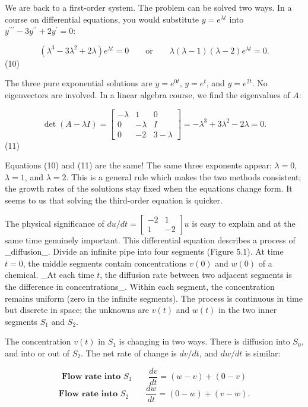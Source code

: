 We are back to a first-order system. The problem can be solved two ways. In a course on differential equations, you would substitute \(y=e^{\lambda t}\) into \(y^{\prime\prime\prime}-3y^{\prime\prime}+2y^{\prime}=0\):

\[(\lambda^{3}-3\lambda^{2}+2\lambda)e^{\lambda t}=0\qquad\text{or}\qquad\lambda( \lambda-1)(\lambda-2)e^{\lambda t}=0.\] (10)

The three pure exponential solutions are \(y=e^{0t}\), \(y=e^{t}\), and \(y=e^{2t}\). No eigenvectors are involved. In a linear algebra course, we find the eigenvalues of \(A\):

\[\det(A-\lambda I)=\begin{bmatrix}-\lambda&1&0\\ 0&-\lambda&I\\ 0&-2&3-\lambda\end{bmatrix}=-\lambda^{3}+3\lambda^{2}-2\lambda=0.\] (11)

Equations (10) and (11) are the same! The same three exponents appear: \(\lambda=0\), \(\lambda=1\), and \(\lambda=2\). This is a general rule which makes the two methods consistent; the growth rates of the solutions stay fixed when the equations change form. It seems to us that solving the third-order equation is quicker.

The physical significance of \(du/dt=\left[\begin{smallmatrix}-2&1\\ 1&-2\end{smallmatrix}\right]u\) is easy to explain and at the same time genuinely important. This differential equation describes a process of _diffusion_. Divide an infinite pipe into four segments (Figure 5.1). At time \(t=0\), the middle segments contain concentrations \(v(0)\) and \(w(0)\) of a chemical. _At each time \(t\), the diffusion rate between two adjacent segments is the difference in concentrations_. Within each segment, the concentration remains uniform (zero in the infinite segments). The process is continuous in time but discrete in space; the unknowns are \(v(t)\) and \(w(t)\) in the two inner segments \(S_{1}\) and \(S_{2}\).

The concentration \(v(t)\) in \(S_{1}\) is changing in two ways. There is diffusion into \(S_{0}\), and into or out of \(S_{2}\). The net rate of change is \(dv/dt\), and \(dw/dt\) is similar:

\[\textbf{Flow rate into }S_{1}\qquad\frac{dv}{dt}=(w-v)+(0-v)\] \[\textbf{Flow rate into }S_{2}\qquad\frac{dw}{dt}=(0-w)+(v-w).\]

